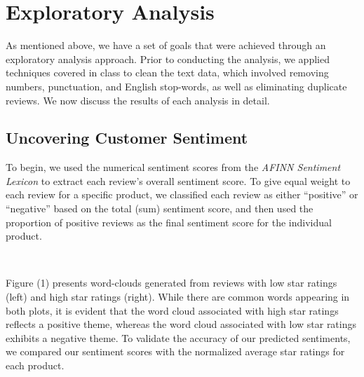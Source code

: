 \documentclass[10pt]{article}
\begin{document}
\section{Exploratory Analysis}

As mentioned above, we have a set of goals that were achieved through an exploratory analysis approach. Prior to conducting the analysis, we applied techniques covered in class to clean the text data, which involved removing numbers, punctuation, and English stop-words, as well as eliminating duplicate reviews. We now discuss the results of each analysis in detail.

\subsection{Uncovering Customer Sentiment}

To begin, we used the numerical sentiment scores from the \textit{AFINN Sentiment Lexicon} to extract each review's overall sentiment score. To give equal weight to each review for a specific product, we classified each review as either ``positive'' or ``negative'' based on the total (sum) sentiment score, and then used the proportion of positive reviews as the final sentiment score for the individual product.

\

Figure (1) presents word-clouds generated from reviews with low star ratings (left) and high star ratings (right). While there are common words appearing in both plots, it is evident that the word cloud associated with high star ratings reflects a positive theme, whereas the word cloud associated with low star ratings exhibits a negative theme. To validate the accuracy of our predicted sentiments, we compared our sentiment scores with the normalized average star ratings for each product.
\end{document}
